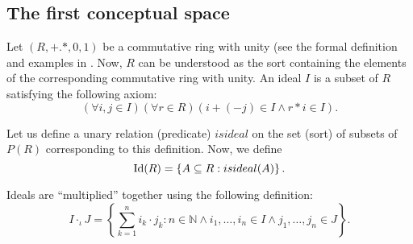 

\subsection{The first conceptual space}
Let $(R,+.*,0,1)$ be a commutative ring with unity (see the formal
definition and examples in \cite{eisenbud}. Now, $R$ can be understood
as the sort containing the elements of the corresponding commutative
ring with unity.  An ideal $I$ is a subset of $R$ satisfying the
following axiom:
\[(\forall i,j\in I)(\forall r\in R)(i+(-j)\in I \wedge r*i\in I).\]

Let us define a unary relation (predicate) $isideal$
on the set (sort) of subsets of $P(R)$ corresponding to this definition.
Now, we define
\[{\rm Id}(R)=\left\{A\subseteq R: isideal(A) \right\}.\]

Ideals are ``multiplied'' together using the following definition:
%
%
\[I\cdot_{\iota} J=\left\{\sum_{k=1}^ni_k\cdot j_k:n \in \mathbb{N} \wedge i_1, \ldots, i_n\in I \wedge j_1, \ldots, j_n\in J \right\}.\]

